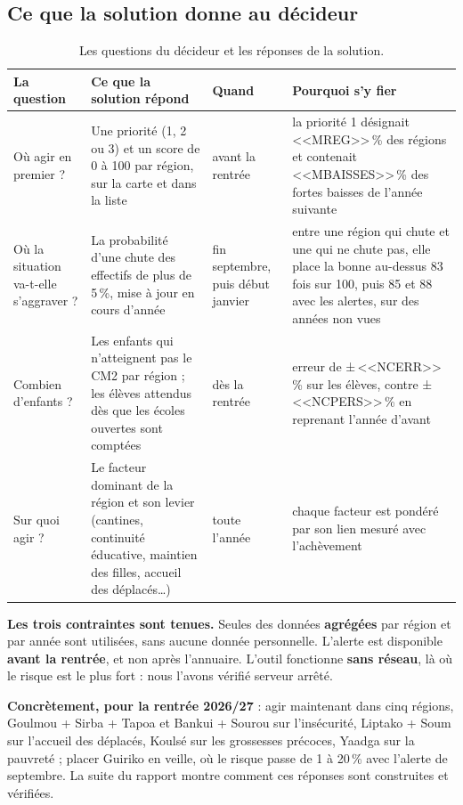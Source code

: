 \documentclass[11pt,a4paper]{article}
\begin{document}
\subsection{Ce que la solution donne au décideur}
\begin{table}[H]\centering\small
\begin{tabularx}{\textwidth}{@{}>{\raggedright}p{2.6cm}>{\raggedright}X>{\raggedright}p{2.2cm}>{\raggedright\arraybackslash}X@{}}\toprule
La question & Ce que la solution répond & Quand & Pourquoi s'y fier\\\midrule
Où agir en premier ? & Une priorité (1, 2 ou 3) et un score de 0 à 100 par région, sur la carte et dans la liste & avant la rentrée & la priorité 1 désignait <<MREG>>\,\% des régions et contenait <<MBAISSES>>\,\% des fortes baisses de l'année suivante\\
Où la situation va-t-elle s'aggraver ? & La probabilité d'une chute des effectifs de plus de 5\,\%, mise à jour en cours d'année & fin septembre, puis début janvier & entre une région qui chute et une qui ne chute pas, elle place la bonne au-dessus 83 fois sur 100, puis 85 et 88 avec les alertes, sur des années non vues\\
Combien d'enfants ? & Les enfants qui n'atteignent pas le CM2 par région ; les élèves attendus dès que les écoles ouvertes sont comptées & dès la rentrée & erreur de ±\,<<NCERR>>\,\% sur les élèves, contre ±\,<<NCPERS>>\,\% en reprenant l'année d'avant\\
Sur quoi agir ? & Le facteur dominant de la région et son levier (cantines, continuité éducative, maintien des filles, accueil des déplacés…) & toute l'année & chaque facteur est pondéré par son lien mesuré avec l'achèvement\\\bottomrule
\end{tabularx}\caption{Les questions du décideur et les réponses de la solution.}\end{table}

\textbf{Les trois contraintes sont tenues.} Seules des données \textbf{agrégées} par région et par année sont utilisées, sans aucune donnée personnelle. L'alerte est disponible \textbf{avant la rentrée}, et non après l'annuaire. L'outil fonctionne \textbf{sans réseau}, là où le risque est le plus fort : nous l'avons vérifié serveur arrêté.

\textbf{Concrètement, pour la rentrée 2026/27} : agir maintenant dans cinq régions, Goulmou + Sirba + Tapoa et Bankui + Sourou sur l'insécurité, Liptako + Soum sur l'accueil des déplacés, Koulsé sur les grossesses précoces, Yaadga sur la pauvreté ; placer Guiriko en veille, où le risque passe de 1 à 20\,\% avec l'alerte de septembre. La suite du rapport montre comment ces réponses sont construites et vérifiées.
\end{document}
